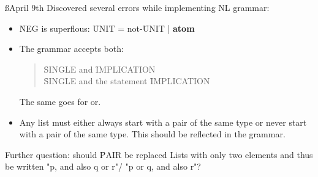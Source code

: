 \documentclass[a4paper]{article}
\begin{document}
\ss{April 9th}
Discovered several errors while implementing NL grammar:
\begin{itemize}
    \item \f{NEG} is superflous: \f{UNIT} = not-\f{UNIT} | {\bf atom}
    \item The grammar accepts both:
        \begin{quote}\f{SINGLE} and \f{IMPLICATION}\\
                     \f{SINGLE} and the statement \f{IMPLICATION}
        \end{quote}
        The same goes for or.
    \item Any list must either always start with a pair of the same type or
    never start with a pair of the same type. This should be reflected in 
    the grammar.
\end{itemize}
Further question: should \f{PAIR} be replaced Lists with only two elements
and thus be written "p, and also q or r"/ "p or q, and also r"?

\label{LastBody}
\end{document}
